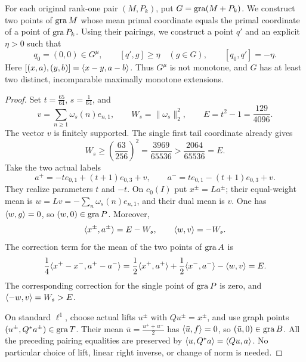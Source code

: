 \begin{corollary}
\label{cor:incompatible}
For each original rank-one pair $(M,P_k)$, put
$G=\operatorname{gra}(M+P_k)$. We construct two points of $\operatorname{gra} M$ whose mean primal
coordinate equals the primal coordinate of a point of $\operatorname{gra} P_k$.
Using their pairings, we construct a point $q'$ and an explicit $\eta>0$ such that
\begin{equation}
q_0=(0,0)\in G^\mu,\qquad
[q',g]\ge\eta\quad(g\in G),\qquad
[q_0,q']=-\eta.
\label{eq:cor-incompatible}
\end{equation}
Here $[(x,a),(y,b)]=\langle x-y,a-b\rangle$.
Thus $G^\mu$ is not monotone, and $G$ has at least two distinct,
incomparable maximally monotone extensions.
\end{corollary}
\begin{proof}
Set $t=\frac{65}{64}$, $s=\frac{1}{64}$, and
\[
v=\sum_{n\ge1}\omega_s(n)e_{n,1},\qquad
W_s=\|\omega_s\|_2^2,\qquad E=t^2-1=\frac{129}{4096}.
\]
The vector $v$ is finitely supported. The single first tail coordinate
already gives
\[
W_s\ge\left(\frac{63}{256}\right)^2
  =\frac{3969}{65536}>\frac{2064}{65536}=E.
\]
Take the two actual labels
\[
a^+=-t e_{0,1}+(t+1)e_{0,3}+v,
\qquad
a^-=t e_{0,1}-(t+1)e_{0,3}+v.
\]
They realize parameters $t$ and $-t$. On $c_0(I)$ put
$x^\pm=La^\pm$; their equal-weight mean is
$w=Lv=-\sum_n\omega_s(n)e_{n,1}$, and their dual mean is $v$.
One has $\langle w,g\rangle=0$, so $(w,0)\in\operatorname{gra} P$.
Moreover,
\[
\langle x^\pm,a^\pm\rangle=E-W_s,\qquad
\langle w,v\rangle=-W_s.
\]
The correction term for the mean of the two points of $\operatorname{gra} A$ is
\[
\frac14\langle x^+-x^-,a^+-a^-\rangle
=\frac12\langle x^+,a^+\rangle+\frac12\langle x^-,a^-\rangle
  -\langle w,v\rangle=E.
\]
The corresponding correction for the single point of $\operatorname{gra} P$ is zero,
and $\langle -w,v\rangle=W_s>E$.

On standard $\ell^1$, choose actual lifts $u^\pm$ with
$Qu^\pm=x^\pm$, and use graph points $(u^\pm,Q^*a^\pm)\in\operatorname{gra} T$.
Their mean $\bar u=\frac{u^++u^-}{2}$ has
$\langle \bar u,f\rangle=0$, so $(\bar u,0)\in\operatorname{gra} B$.
All the preceding pairing equalities are preserved by
$\langle u,Q^*a\rangle=\langle Qu,a\rangle$. No particular choice of lift,
linear right inverse, or change of norm is needed.


\end{proof}
